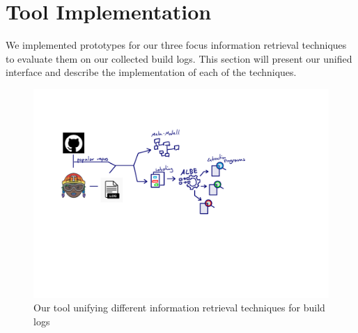 \documentclass[\myrootdir/main.tex]{subfiles}
\begin{document}
\chapter{Tool Implementation}
\label{sec:implementation}
We implemented prototypes for our three focus information retrieval techniques to evaluate them on our collected build logs.
This section will present our unified interface and describe the implementation of each of the techniques.


\begin{figure}[h]
	\centering
	\includegraphics[page=7, width=\textwidth, trim={0.5cm 0.5cm 0.5cm 0.5cm}, clip]{img/flow-of-research.pdf}
	\caption{Our tool unifying different information retrieval techniques for build logs}
	\label{fig:tool}
\end{figure}
\end{document}
